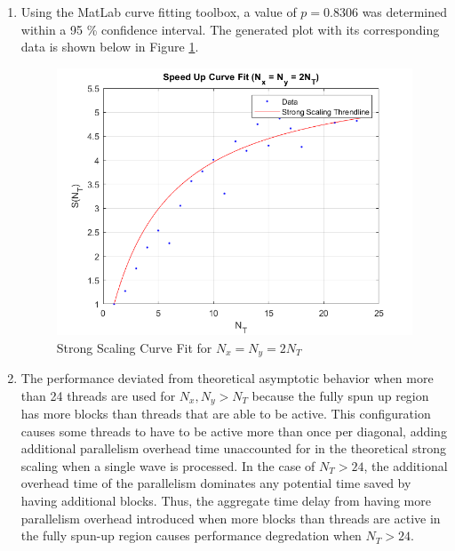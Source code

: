 \documentclass[11pt]{article}
\begin{document}
\begin{enumerate}[leftmargin=0.9in]
\begin{enumerate}[leftmargin=0.3in]
      \item Using the MatLab curve fitting toolbox, a value of $p = 0.8306$ was determined within a 95 \% confidence interval. The generated plot with its corresponding data is shown below in Figure \ref{fig:2}.
          \begin{figure}[H]
          \centering
          \includegraphics[width=12cm]{./figures/problem1b.png}
          \caption{Strong Scaling Curve Fit for $N_x = N_y = 2N_T$}
          \label{fig:2}
          \end{figure}

      \item The performance deviated from theoretical asymptotic behavior when more than 24 threads are used for $N_x, N_y > N_T$ because the fully spun up region has more blocks than threads that are able to be active. This configuration causes some threads to have to be active more than once per diagonal, adding additional parallelism overhead time unaccounted for in the theoretical strong scaling when a single wave is processed. In the case of $N_T > 24$, the additional overhead time of the parallelism dominates any potential time saved by having additional blocks. Thus, the aggregate time delay from having more parallelism overhead introduced when more blocks than threads are active in the fully spun-up region causes performance degredation when $N_T > 24$.


\end{enumerate}
\end{enumerate}
\end{document}
